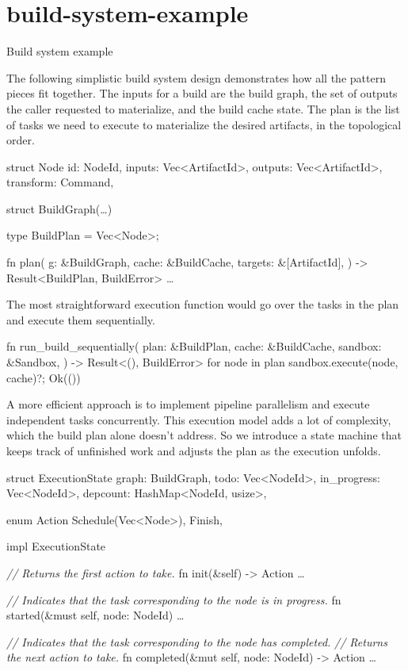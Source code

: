 \documentclass{article}
\begin{document}
\section{build-system-example}{Build system example}

The following simplistic build system design demonstrates how all the pattern pieces fit together.
The inputs for a build are the build graph, the set of outputs the caller requested to materialize, and the build cache state.
The plan is the list of tasks we need to execute to materialize the desired artifacts, in the topological order.

\begin{code}[rust]
struct Node {
    id: NodeId,
    inputs: Vec<ArtifactId>,
    outputs: Vec<ArtifactId>,
    transform: Command,
}

struct BuildGraph(\ldots)

type BuildPlan = Vec<Node>;

fn plan(
    g: &BuildGraph,
    cache: &BuildCache,
    targets: &[ArtifactId],
) -> Result<BuildPlan, BuildError> { \ldots  }
\end{code}

The most straightforward execution function would go over the tasks in the plan and execute them sequentially.

\begin{code}[rust]
fn run_build_sequentially(
    plan: &BuildPlan,
    cache: &BuildCache,
    sandbox: &Sandbox,
) -> Result<(), BuildError> {
    for node in plan {
        sandbox.execute(node, cache)?;
    }
    Ok(())
}
\end{code}

A more efficient approach is to implement pipeline parallelism and execute independent tasks concurrently.
This execution model adds a lot of complexity, which the build plan alone doesn't address.
So we introduce a state machine that keeps track of unfinished work and adjusts the plan as the execution unfolds.

\begin{code}[rust]
struct ExecutionState {
    graph: BuildGraph,
    todo: Vec<NodeId>,
    in_progress: Vec<NodeId>,
    depcount: HashMap<NodeId, usize>,
}

enum Action {
    Schedule(Vec<Node>),
    Finish,
}

impl ExecutionState {
    \emph{// Returns the first action to take.}
    fn init(&self) -> Action { \ldots  }

    \emph{// Indicates that the task corresponding to the node is in progress.}
    fn started(&must self, node: NodeId) { \ldots  }

    \emph{// Indicates that the task corresponding to the node has completed.}
    \emph{// Returns the next action to take.}
    fn completed(&mut self, node: NodeId) -> Action { \ldots  }
}
\end{code}
\end{document}
